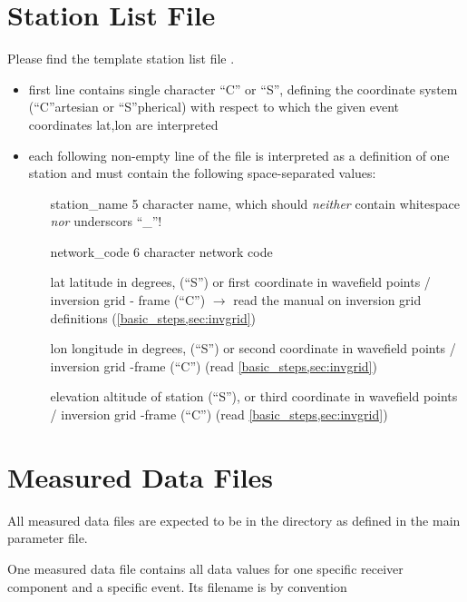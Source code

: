 \section{Station List File} \label{files,sec:station_list}
%
Please find the template station list file .

\begin{itemize}
\item first line contains single character ``C'' or ``S'', defining the coordinate system (``C''artesian or ``S''pherical)
  with respect to which the given event coordinates lat,lon are interpreted
\item each following non-empty line of the file is interpreted as a definition of one station and must 
  contain the following space-separated values:
  \begin{itemize}
  \item[station\_name] 5 character name, which should \emph{neither} contain whitespace \emph{nor} underscors ``\_''!
  \item[network\_code] 6 character network code
  \item[lat] latitude in degrees,  (``S'') or first coordinate in 
    wavefield points / inversion grid - frame (``C'') $\rightarrow$  read the manual on inversion grid definitions 
    (\ref{basic_steps,sec:invgrid})
  \item[lon] longitude in degrees,  (``S'') or second  coordinate in 
    wavefield points / inversion grid -frame (``C'') (read \ref{basic_steps,sec:invgrid})
  \item[elevation] altitude of station (``S''), or third coordinate in wavefield points / inversion grid -frame (``C'') (read \ref{basic_steps,sec:invgrid})
  \end{itemize}
\end{itemize}
%
\section{Measured Data Files} \label{files,sec:measured_data}
%
All measured data files are expected to be in the directory  as defined
in the main parameter file.

One measured data file contains all data values for one specific receiver component and a specific event.
Its filename is by convention 

